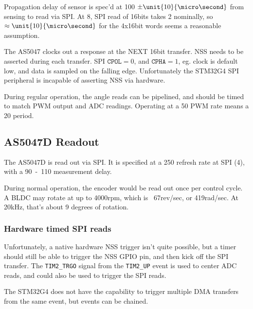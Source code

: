 \documentclass[12pt,a4paper,oneside,openany]{article}
\begin{document}
Propagation delay of sensor is spec'd at \unit{100}{\micro\second} $\pm\unit{10}{\micro\second}$ from sensing to read via SPI. At \unit{8}{\mega\hertz}, SPI read of 16bits takes \unit{2}{\micro\second} nominally, so $\approx\unit{10}{\micro\second}$ for the 4x16bit words seems a reasonable assumption.

The AS5047 clocks out a response at the NEXT 16bit transfer. NSS needs to be asserted during each transfer. SPI $\texttt{CPOL}=0$, and $\texttt{CPHA}=1$, eg. clock is default low, and data is sampled on the falling edge. Unfortunately the STM32G4 SPI peripheral is incapable of asserting NSS via hardware. 

During regular operation, the angle reads can be pipelined, and should be timed to match PWM output and ADC readings. Operating at a \unit{50}{\kilo\hertz} PWM rate means a \unit{20}{\micro\second} period. 


\subsection{AS5047D Readout}

The AS5047D is read out via SPI. It is specified at a \unit{250}{\nano\second} refresh rate at SPI (\unit{4}{\mega\hertz}), with a \unit{90-110}{\micro\second} measurement delay. 

During normal operation, the encoder would be read out once per control cycle. A BLDC may rotate at up to 4000rpm, which is ~67rev/sec, or 419rad/sec. At 20kHz, that's about 9 degrees of rotation.

\subsubsection{Hardware timed SPI reads}

Unfortunately, a native hardware NSS trigger isn't quite possible, but a timer should still be able to trigger the NSS GPIO pin, and then kick off the SPI transfer. The \texttt{TIM2\_TRGO} signal from the \texttt{TIM2\_UP} event is used to center ADC reads, and could also be used to trigger the SPI reads.

The STM32G4 does not have the capability to trigger multiple DMA transfers from the same event, but events can be chained.
\end{document}
